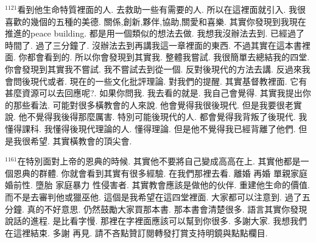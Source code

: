 \documentclass{book}
\begin{document}
$^{1121}$看到他生命特質裡面的人.
去救助一些有需要的人.
所以在這裡面就引入.
我很喜歡的幾個的五種的美德.
關係,創新,夥伴,協助,關愛和喜樂.
其實你發現到我現在推進的peace building.
都是用一個類似的想法去做.
我想我沒辦法去到.
已經過了時間了.
過了三分鐘了.
沒辦法去到再講我這一章裡面的東西.
不過其實在這本書裡面.
你都會看到的.
所以你會發現到其實我.
整體我嘗試.
我很簡單去總結我的四堂.
你會發現到其實我不嘗試.
我不嘗試去到從一個.
反對後現代的方法去講.
反過來我會問後現代或者.
現在的一些文化批評理論.
對我們的提醒.
其實基督教裡面.
它有甚麼資源可以去回應呢?.
如果你問我.
我去看的就是.
我自己會覺得.
其實我提出你的那些看法.
可能對很多橫教會的人來說.
他會覺得我很後現代.
但是我要很老實說.
他不覺得我後得那麼厲害.
特別可能後現代的人.
都會覺得我背叛了後現代.
我懂得課科.
我懂得後現代理論的人.
懂得理論.
但是他不覺得我已經背離了他們.
但是我很希望.
其實橫教會的頂尖會.

$^{1161}$在特別面對上帝的恩典的時候.
其實他不要將自己變成高高在上.
其實他都是一個恩典的群體.
你就會看到其實有很多經驗.
在我們那裡去看.
離婚 再婚 單親家庭 婚前性.
墮胎 家庭暴力 性侵害者.
其實教會應該是做他的伙伴.
重建他生命的價值.
而不是去審判他或獵巫他.
這個是我希望在這四堂裡面.
大家都可以注意到.
過了五分鐘.
真的不好意思.
仍然鼓勵大家買那本書.
那本書會清楚很多.
語言其實你發現說話的進程.
是比看字慢.
那裡在字裡面應該可以幫到你很多.
多謝大家.
我想我們在這裡結束.
多謝 再見.
請不吝點贊訂閱轉發打賞支持明鏡與點點欄目.
\newpage
\end{document}
